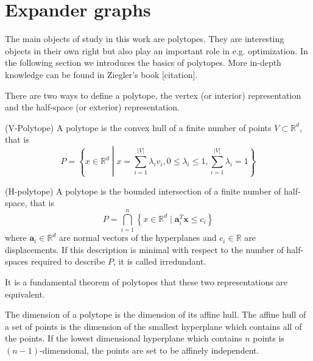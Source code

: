 \chapter{Expander graphs}
\label{mathchapter}


The main objects of study in this work are polytopes. They are interesting 
objects in their own right but also play an important role in e.g. 
optimization. In the following section we introduces the basics of polytopes. 
More in-depth knowledge can be found in Ziegler's book [citation]. 

There are 
two ways to define a polytope, the vertex (or interior) representation and the 
half-space (or exterior) representation.

\begin{definition}
(V-Polytope) A polytope is the convex hull of a finite number of points $V 
\subset \mathbb{R}^d$, that is 
\begin{equation}
 P = \left\{x\in \mathbb{R}^d \middle| x = \sum_{i=1}^{|V|} \lambda_i v_i, 
0\leq \lambda_i \leq 1, \sum_{i=1}^{|V|} \lambda_i = 1 \right\}
\end{equation}

\end{definition}

\begin{definition}
 (H-polytope) A polytope is the bounded intersection of a finite number of 
half-space, that is
\begin{equation}
 P = \bigcap_{i=1}^n \left\{x \in \mathbb{R}^d \mid \mathbf{a}_i^T \mathbf{x} 
\leq 
c_i \right\}
\end{equation}
where $\mathbf{a}_i \in \mathbb{R}^d$ are normal vectors of the hyperplanes and 
$c_i \in 
\mathbb{R}$ are displacements. If this description is minimal with respect to 
the number of half-spaces required to describe $P$, it is called irredundant.
\end{definition}

It is a fundamental theorem of polytopes that these two representations are 
equivalent.

The dimension of a polytope is the dimension of its affine hull. The affine 
hull of a set of points is the dimension of the smallest hyperplane which 
contains all of the points. If the lowest dimensional hyperplane which contains 
$n$ points is $(n-1)$-dimensional, the points are set to be affinely 
independent.

